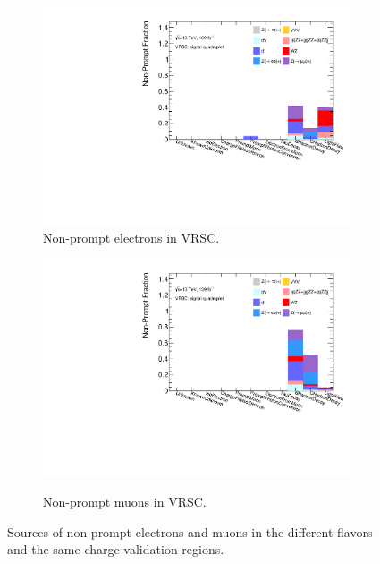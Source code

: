 \begin{figure}[htb]
\begin{subfigure}{.48\textwidth}
        \includegraphics[width=.9\linewidth]{figures/Analysis/Background/NonPromptCRSCSignal_Electrons_.pdf}
    \caption{Non-prompt electrons in VRSC.\label{fig:VRSC_Elec_NonPromptComp}}
    \end{subfigure}
    \begin{subfigure}{.48\textwidth}
        \centering
        {\includegraphics[width=.9\linewidth]{figures/Analysis/Background/NonPromptCRSCSignal_Muons_.pdf}}\\
        \caption{Non-prompt muons in VRSC.\label{fig:VRSC_Muon_NonPromptComp}}
    \end{subfigure}
    \caption{ Sources of non-prompt electrons and muons in the different flavors and the same charge validation regions. \label{fig:VRNonPromptComposition}}
\end{figure}


